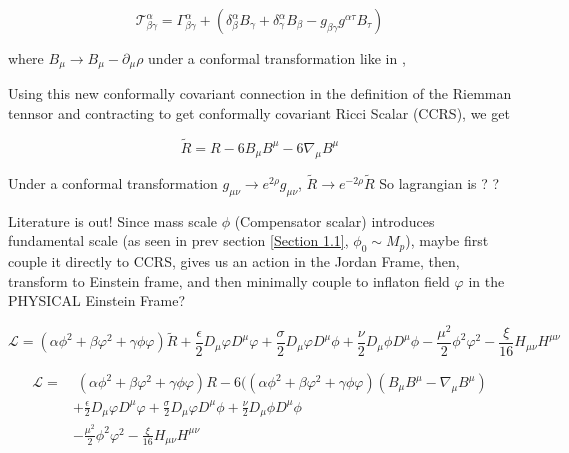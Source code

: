 \documentclass{article}
\begin{document}
\begin{equation}
    \mathcal{T}^{\alpha}_{\beta \gamma} = \Gamma^{\alpha}_{\beta \gamma} + (\delta^{\alpha}_{\beta} B_{\gamma} + \delta^{\alpha}_{\gamma} B_{\beta} - g_{\beta \gamma}g^{\alpha \tau}B_{\tau})
\end{equation}

where $B_{\mu} \rightarrow B_{\mu} - \partial_{\mu} \rho$ under a conformal transformation like in \cite{barker2024poincaregaugetheoryconformal}, 

Using this new conformally covariant connection in the definition of the Riemman tennsor and contracting to get conformally covariant Ricci Scalar (CCRS), we get 


\begin{equation}
    \tilde{R} = R - 6 B_{\mu} B^{\mu} - 6 \nabla_\mu B^\mu
\end{equation}

Under a conformal transformation $g_{\mu\nu} \rightarrow e^{2\rho}g_{\mu\nu}$, $\tilde{R} \rightarrow e^{-2\rho} \tilde{R}$
So lagrangian is ? ? 

Literature is out! Since mass scale $\phi$ (Compensator scalar) introduces fundamental scale (as seen in prev section \ref{Section 1.1}, $\phi_0 \sim M_p$), maybe first couple it directly to CCRS, gives us an action in the Jordan Frame, then, transform to Einstein frame, and then minimally couple to inflaton field $\varphi$ in the PHYSICAL Einstein Frame?

\begin{equation}
    \mathcal{L} = (\alpha \phi^2 + \beta \varphi^2 + \gamma \phi \varphi) \tilde{R} + \frac{\epsilon}{2} D_{\mu}\varphi D^{\mu}\varphi + \frac{\sigma}{2} D_{\mu}\varphi D^{\mu}\phi  +  \frac{\nu}{2} D_{\mu}\phi D^{\mu}\phi - \frac{\mu^2}{2} \phi^2 \varphi^2 - \frac{\xi}{16} H_{\mu\nu}H^{\mu\nu}
\end{equation}

\begin{equation}
    \begin{aligned}
        \mathcal{L} = &\; (\alpha \phi^2 + \beta \varphi^2 + \gamma \phi \varphi)R - 6((\alpha \phi^2 + \beta \varphi^2 + \gamma \phi \varphi)(B_{\mu} B^{\mu} - \nabla_\mu B^\mu) \\
        & +\frac{\epsilon}{2} D_{\mu}\varphi D^{\mu}\varphi + \frac{\sigma}{2} D_{\mu}\varphi D^{\mu}\phi + \frac{\nu}{2} D_{\mu}\phi D^{\mu}\phi \\
        & - \frac{\mu^2}{2} \phi^2 \varphi^2 - \frac{\xi}{16} H_{\mu\nu}H^{\mu\nu}
    \end{aligned}
\end{equation}
\end{document}
